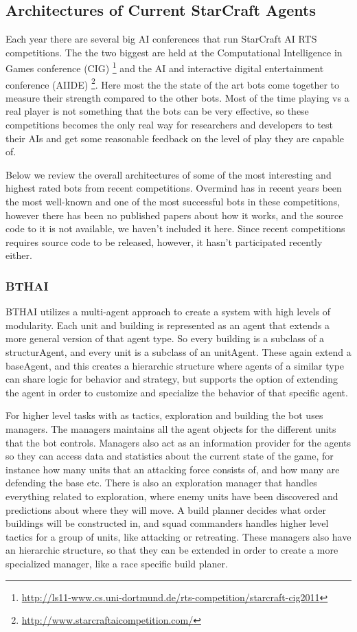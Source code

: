 \subsection{Architectures of Current StarCraft Agents}
Each year there are several big AI conferences that run StarCraft AI RTS
competitions. The the two biggest are held at the Computational Intelligence in
Games conference (CIG) \footnote{\url{
http://ls11-www.cs.uni-dortmund.de/rts-competition/starcraft-cig2011}} and the
AI and interactive digital entertainment conference (AIIDE)
\footnote{\url{http://www.starcraftaicompetition.com/}}. Here most the the state
of the art bots come together to measure their strength compared to the other
bots. Most of the time playing vs a real player is not something that the bots
can be very effective, so these competitions becomes the only real way for
researchers and developers to test their AIs and get some reasonable feedback on
the level of play they are capable of.

Below we review the overall architectures of some of the most interesting and
highest rated bots from recent competitions. Overmind has in recent years been
the most well-known and one of the most successful bots in these competitions,
however there has been no published papers about how it works, and the source
code to it is not available, we haven't included it here. Since recent
competitions requires source code to be released, however, it hasn't
participated recently either.


\subsubsection{BTHAI}
BTHAI utilizes a multi-agent approach to create a system with high levels of
modularity. Each unit and building is represented as an agent that extends a
more general version of that agent type. So every building is a subclass of a
structurAgent, and every unit is a subclass of an unitAgent. These again extend
a baseAgent, and this creates a hierarchic structure where agents of a similar
type can share logic for behavior and strategy, but supports the option of
extending the agent in order to customize and specialize the behavior of that
specific agent. 

For higher level tasks with as tactics, exploration and building the bot uses
managers. The managers maintains all the agent objects for the different units
that the bot controls. Managers also act as an information provider for the
agents so they can access data and statistics about the current state of the
game, for instance how many units that an attacking force consists of, and how
many are defending the base etc. There is also an exploration manager that
handles everything related to exploration, where enemy units have been
discovered and predictions about where they will move. A build planner decides
what order buildings will be constructed in, and squad commanders handles higher
level tactics for a group of units, like attacking or retreating. These managers
also have an hierarchic structure, so that they can be extended in order to
create a more specialized manager, like a race specific build planer. 


